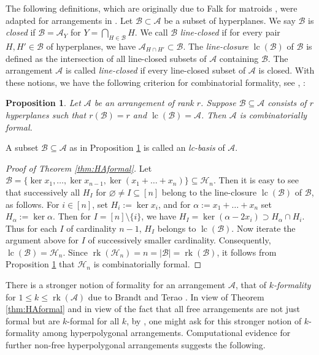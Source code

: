 \documentclass[12pt]{amsart}
\newcommand\CA{{\mathscr A}}
\newcommand\CB{{\mathscr B}}
\newcommand\CH{{\mathscr H}}
\newcommand\rk{\operatorname{rk}}
\newcommand\lc{{\operatorname{lc}}}
\numberwithin{equation}{section}
\theoremstyle{plain}
\newtheorem{prop}[equation]{Proposition}
\theoremstyle{definition}
\begin{document}
The following definitions, which are originally due to Falk  for matroids \cite{falk:line-closure}, were adapted for arrangements in \cite[\S 2.4]{moellermueckschroehre:formal}.
Let $\CB \subset \CA$ be a subset of hyperplanes.
We say $\CB$ is \emph{closed} if $\CB =\CA_Y$ for $Y=\bigcap\limits_{H\in \CB} H$.
We call $\CB $ \emph{line-closed}
if for every pair $H,H'\in \CB $ of hyperplanes, we have $\CA_{H\cap H'}\subset \CB $.
The \emph{line-closure} $\lc(\CB)$ of $\CB $ is defined
as the intersection of all line-closed subsets of $\CA$ containing $\CB$.
The arrangement $\CA$ is called \emph{line-closed}
if every line-closed subset of $\CA$ is closed.
With these notions, we have the following criterion for combinatorial formality, see \cite[Cor.~3.8]{falk:line-closure}, \cite[Prop.~3.2]{moellermueckschroehre:formal}:

\begin{prop}
	\label{prop:lcbasis}
	Let $\CA$ be an arrangement of rank $r$. Suppose $\CB \subseteq \CA$ consists of $r$ hyperplanes such that $r(\CB)=r$ and $\lc(\CB)=\CA$. Then $\CA$ is combinatorially formal.
\end{prop}

A subset $\CB \subseteq \CA$ as in Proposition \ref{prop:lcbasis} is called an \emph{lc-basis} of $\CA$.

\begin{proof}[{Proof of Theorem \ref{thm:HAformal}}]
Let $\CB = \{\ker x_1, \ldots, \ker x_{n-1}, \ker(x_1 + \ldots + x_n)\} \subseteq \CH_n$.
Then it is easy to see that successively all $H_I$ for $\varnothing \ne I \subseteq [n]$ belong to the line-closure $\lc(\CB)$ of $\CB$, as follows. 
For $i \in [n]$, set $H_i := \ker x_i$, and 
for $\alpha := x_1 + \ldots + x_n$ set $H_\alpha := \ker \alpha$. 
Then for $I = [n]\setminus \{i\}$, we have
$H_I = \ker \left(\alpha -2 x_i\right) \supset H_\alpha \cap H_i$. Thus for each $I$ of cardinality $n-1$, $H_I$ belongs to $\lc(\CB)$. Now iterate the argument above for $I$ of successively smaller cardinality.
Consequently, $\lc(\CB) =  \CH_n$. Since
	$\rk(\CH_n) = n = |\CB| = \rk(\CB)$, it follows from Proposition \ref{prop:lcbasis}	that $\CH_n$ is combinatorially formal.
\end{proof}

There is a stronger notion of formality for an arrangement $\CA$, that of \emph{$k$-formality} for $1 \le k \le \rk(\CA)$ due to Brandt and Terao \cite{brandtterao}.
In view of Theorem \ref{thm:HAformal} and in view of the fact that all free arrangements are not just formal but are $k$-formal for all $k$, by \cite[Thm.~4.15]{brandtterao}, one might ask for this stronger notion of $k$-formality among  hyperpolygonal arrangements.
Computational evidence for further non-free  hyperpolygonal arrangements suggests the following.
\end{document}
